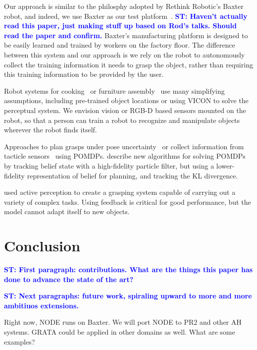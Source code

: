 \documentclass[conference]{IEEEtran}
\newcommand{\stnote}[1]{\textcolor{Blue}{\textbf{ST: #1}}}
\begin{document}
Our approach is similar to the philosphy adopted by Rethink Robotic's
Baxter robot, and indeed, we use Baxter as our test
platform~\citep{fitzgerald13}.  \stnote{Haven't actually read this
  paper, just making stuff up based on Rod's talks.  Should read the
  paper and confirm.}  Baxter's manufacturing platform is designed to
be easily learned and trained by workers on the factory floor.  The
difference between this system and our approach is we rely on the
robot to autonomously collect the training information it needs to
grasp the object, rather than requiring this training information to
be provided by the user.


Robot systems for cooking~\citep{bollini12, beetz11} or furniture
assembly~\citep{knepper13} use many simplifying assumptions, including
pre-trained object locations or using VICON to solve the perceptual
system.  We envision vision or RGB-D based sensors mounted on the
robot, so that a person can train a robot to recognize and manipulate
objects wherever the robot finds itself.

Approaches to plan grasps under pose uncertainty~\citep{stulp11} or
collect information from tacticle sensors~\citep{hsiao10} using
POMDPs.  \citet{plat11} describe new algorithms for solving POMDPs by
tracking belief state with a high-fidelity particle filter, but using
a lower-fidelity representation of belief for planning, and tracking
the KL divergence.

\citet{hudson12} used active perception to create a grasping system
capable of carrying out a variety of complex tasks.  Using feedback is
critical for good performance, but the model cannot adapt itself to
new objects.



\section{Conclusion}

\stnote{First paragraph:  contributions.  What are the things this paper has done to advance the state of the art?}

\stnote{Next paragraphs: future work, spiraling upward to more and
  more ambitiuos extensions.}

Right now, NODE runs on Baxter. We will port NODE to PR2 and other AH systems.
GRATA could be applied in other domains as well.  What are some examples?


%



\end{document}
